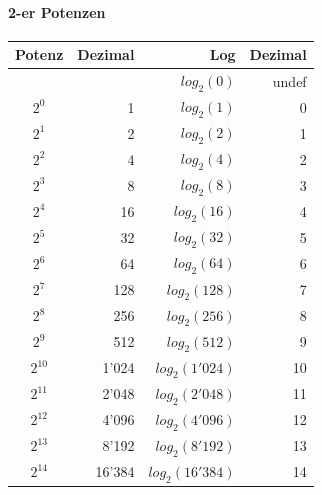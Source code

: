 \paragraph{2-er Potenzen}
\begin{center}
    \begin{tabular}[]{| c | r || r | r |}
        \hline
        Potenz&Dezimal&Log&Dezimal\\
        \hline\hline
                    &           &   $log_2(0)$      & undef\\
        $2^0$       & 1         &   $log_2(1)$      & 0\\
        $2^1$       & 2         &   $log_2(2)$      & 1\\
        $2^2$       & 4         &   $log_2(4)$      & 2\\
        $2^3$       & 8         &   $log_2(8)$      & 3\\
        $2^4$       & 16        &   $log_2(16)$     & 4\\
        $2^5$       & 32        &   $log_2(32)$     & 5\\
        $2^6$       & 64        &   $log_2(64)$     & 6\\
        $2^7$       & 128       &   $log_2(128)$    & 7\\
        $2^8$       & 256       &   $log_2(256)$    & 8\\
        $2^9$       & 512       &   $log_2(512)$    & 9\\
        $2^{10}$    & 1'024     &   $log_2(1'024)$  & 10\\
        $2^{11}$    & 2'048     &   $log_2(2'048)$  & 11\\
        $2^{12}$    & 4'096     &   $log_2(4'096)$  & 12\\
        $2^{13}$    & 8'192     &   $log_2(8'192)$  & 13\\
        $2^{14}$    & 16'384    &   $log_2(16'384)$ & 14\\
        \hline
    \end{tabular}
\end{center}

